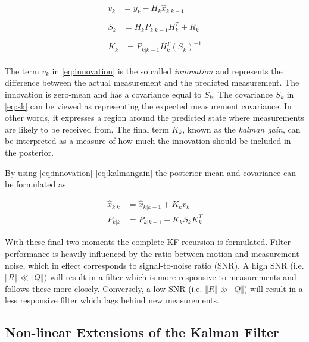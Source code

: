 \begin{align}
    \begin{split}
        v_k &= y_k - H_k\hat{x}_{k|k-1}
    \end{split}\label{eq:innovation} \\
    \begin{split}
        S_k &= H_{k}P_{k|k-1}H_{k}^{T} + R_k
    \end{split}\label{eq:sk} \\
    \begin{split}
        K_k &= P_{k|k-1}H_{k}^{T}(S_k)^{-1}
    \end{split}\label{eq:kalmangain}
\end{align}

The term $v_k$ in \eqref{eq:innovation} is the so called \textit{innovation} and represents the difference between the actual measurement and the predicted measurement. The innovation is zero-mean and has a covariance equal to $S_k$. The covariance $S_k$ in \eqref{eq:sk} can be viewed as representing the expected measurement covariance. In other words, it expresses a region around the predicted state where measurements are likely to be received from. The final term $K_k$, known as the \textit{kalman gain}, can be interpreted as a measure of how much the innovation should be included in the posterior.

By using \eqref{eq:innovation}-\eqref{eq:kalmangain} the posterior mean and covariance can be formulated as

\begin{equation}
    \begin{split}
        \hat{x}_{k|k} &= \hat{x}_{k|k-1} + K_{k}v_{k} \\
        P_{k|k} &= P_{k|k-1} - K_{k}S_{k}K_{k}^{T}
    \end{split}
\end{equation}

With these final two moments the complete KF recursion is formulated. Filter performance is heavily influenced by the ratio between motion and measurement noise, which in effect corresponds to signal-to-noise ratio (SNR). A high SNR (i.e. $\Vert R\Vert \ll \Vert Q\Vert$) will result in a filter which is more responsive to measurements and follows these more closely. Conversely, a low SNR (i.e. $\Vert R\Vert \gg \Vert Q\Vert$) will result in a less responsive filter which lags behind new measurements. 

\subsection{Non-linear Extensions of the Kalman Filter}

